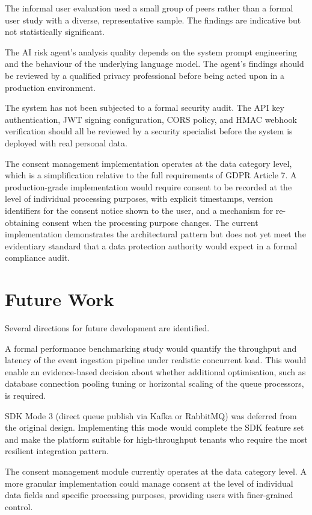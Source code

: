 \documentclass[a4paper,12pt,onecolumn]{report}
\begin{document}
The informal user evaluation used a small group of peers rather than a formal user study with a diverse, representative sample.
The findings are indicative but not statistically significant.

The AI risk agent's analysis quality depends on the system prompt engineering and the behaviour of the underlying language model.
The agent's findings should be reviewed by a qualified privacy professional before being acted upon in a production environment.

The system has not been subjected to a formal security audit.
The API key authentication, JWT signing configuration, CORS policy, and HMAC webhook verification should all be reviewed by a security specialist before the system is deployed with real personal data.

The consent management implementation operates at the data category level, which is a simplification relative to the full requirements of GDPR Article 7.
A production-grade implementation would require consent to be recorded at the level of individual processing purposes, with explicit timestamps, version identifiers for the consent notice shown to the user, and a mechanism for re-obtaining consent when the processing purpose changes.
The current implementation demonstrates the architectural pattern but does not yet meet the evidentiary standard that a data protection authority would expect in a formal compliance audit.

\section{Future Work}

Several directions for future development are identified.

A formal performance benchmarking study would quantify the throughput and latency of the event ingestion pipeline under realistic concurrent load.
This would enable an evidence-based decision about whether additional optimisation, such as database connection pooling tuning or horizontal scaling of the queue processors, is required.

SDK Mode 3 (direct queue publish via Kafka or RabbitMQ) was deferred from the original design.
Implementing this mode would complete the SDK feature set and make the platform suitable for high-throughput tenants who require the most resilient integration pattern.

The consent management module currently operates at the data category level.
A more granular implementation could manage consent at the level of individual data fields and specific processing purposes, providing users with finer-grained control.
\end{document}
